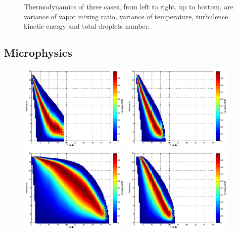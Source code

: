 \documentclass[12pt]{article}
\begin{document}
\begin{figure}[H]
\caption{Thermodynamics of three cases, from left to right, up to bottom, are variance of vapor mixing ratio, variance of temperature, turbulence kinetic energy and total droplets number.\label{fig:therm_dynam}}
\end{figure}

\subsection{Microphysics}
\begin{figure}[H]
\includegraphics[width=0.48\textwidth]{Figures/pdf_radius_d1}
\includegraphics[width=0.48\textwidth]{Figures/pdf_radius_f1}\\
\includegraphics[width=0.48\textwidth]{Figures/pdf_radius_d2}
\includegraphics[width=0.48\textwidth]{Figures/pdf_radius_f2}\\

\end{figure}
\end{document}
